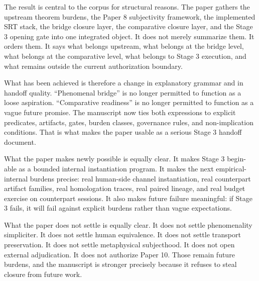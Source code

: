 \documentclass[11pt,a4paper]{article}
\theoremstyle{definition}
\begin{document}
The result is central to the corpus for structural reasons. The paper gathers the upstream theorem burdens, the Paper 8 subjectivity framework, the implemented SRT stack, the bridge closure layer, the comparative closure layer, and the Stage 3 opening gate into one integrated object. It does not merely summarize them. It orders them. It says what belongs upstream, what belongs at the bridge level, what belongs at the comparative level, what belongs to Stage 3 execution, and what remains outside the current authorization boundary.

What has been achieved is therefore a change in explanatory grammar and in handoff quality. ``Phenomenal bridge'' is no longer permitted to function as a loose aspiration. ``Comparative readiness'' is no longer permitted to function as a vague future promise. The manuscript now ties both expressions to explicit predicates, artifacts, gates, burden classes, governance rules, and non-implication conditions. That is what makes the paper usable as a serious Stage 3 handoff document.

What the paper makes newly possible is equally clear. It makes Stage 3 begin-able as a bounded internal instantiation program. It makes the next empirical-internal burdens precise: real human-side channel instantiation, real counterpart artifact families, real homologation traces, real paired lineage, and real budget exercise on counterpart sessions. It also makes future failure meaningful: if Stage 3 fails, it will fail against explicit burdens rather than vague expectations.

What the paper does not settle is equally clear. It does not settle phenomenality simpliciter. It does not settle human equivalence. It does not settle transport preservation. It does not settle metaphysical subjecthood. It does not open external adjudication. It does not authorize Paper 10. Those remain future burdens, and the manuscript is stronger precisely because it refuses to steal closure from future work.

\appendix
\end{document}
